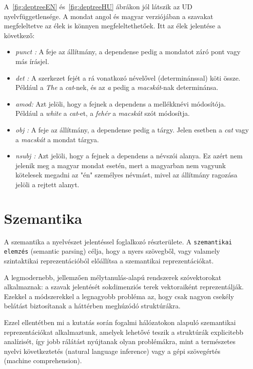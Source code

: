 A~\ref{fig:deptreeEN} és~\ref{fig:deptreeHU} ábrákon jól látszik az UD nyelvfüggetlensége. A mondat angol és magyar verziójában a szavakat megfeleltetve az élek is könnyen megfeleltethetőek.
Itt az élek jelentése a következő:
\begin{itemize}
\item \emph{punct : } 
A feje az állítmány, a dependense pedig a mondatot záró pont vagy más írásjel.
\item \emph{det : } 
A szerkezet fejét a rá vonatkozó névelővel (determinánssal) köti össze. 
Például a \textit{The} a \textit{cat}-nek, és az \textit{a} pedig a \textit{macskát}-nak determinánsa.
\item \emph{amod: } 
Azt jelöli, hogy a fejnek a dependens a mellékknévi módosítója.
Például a \textit{white} a \textit{cat}-et, a \textit{fehér} a \textit{macskát} szót módosítja.
\item \emph{obj : }  
A feje az állítmány, a dependense pedig a tárgy.
Jelen esetben a \textit{cat} vagy a \textit{macskát} a mondat tárgya.
\item \emph{nsubj : } 
Azt jelöli, hogy a fejnek a dependens a névszói alanya. 
Ez azért nem jelenik meg a magyar mondat esetén, mert a magyarban nem vagyunk kötelesek megadni az "én" személyes névmást, mivel az állítmány ragozása jelöli a rejtett alanyt.
\end{itemize}

\section{Szemantika}
\label{sec:semantics}

A szemantika a nyelvészet jelentéssel foglalkozó részterülete. A \texttt{szemantikai elemzés} (semantic parsing) célja, hogy a nyers szövegből, vagy valamely szintaktikai reprezentációból előállítsa a szemantikai reprezentációkat.

A legmodernebb, jellemzően mélytanulás-alapú rendszerek szóvektorokat alkalmaznak: a szavak jelentését sokdimenziós terek vektoraiként reprezentálják. Ezekkel a módszerekkel a legnagyobb probléma az, hogy csak nagyon csekély belátást biztosítanak a háttérben meghúzódó struktúrákra.

Ezzel ellentétben mi a kutatás során fogalmi hálózatokon alapuló szemantikai reprezentációkat alkalmaztunk, amelyek lehetővé teszik a struktúrák explicitebb analízisét, így jobb rálátást nyújtanak olyan problémákra, mint a természetes nyelvi következtetés (natural language inference) vagy a gépi szövegértés (machine comprehension).

